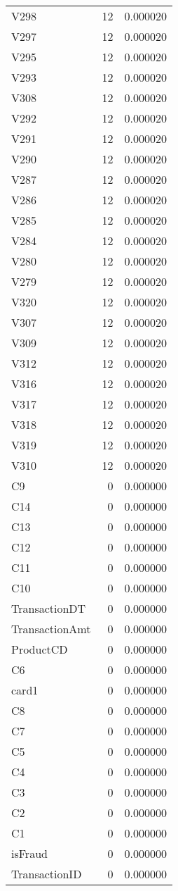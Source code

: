 \begin{tabular}{lrr}
V298 & 12 & 0.000020 \\
V297 & 12 & 0.000020 \\
V295 & 12 & 0.000020 \\
V293 & 12 & 0.000020 \\
V308 & 12 & 0.000020 \\
V292 & 12 & 0.000020 \\
V291 & 12 & 0.000020 \\
V290 & 12 & 0.000020 \\
V287 & 12 & 0.000020 \\
V286 & 12 & 0.000020 \\
V285 & 12 & 0.000020 \\
V284 & 12 & 0.000020 \\
V280 & 12 & 0.000020 \\
V279 & 12 & 0.000020 \\
V320 & 12 & 0.000020 \\
V307 & 12 & 0.000020 \\
V309 & 12 & 0.000020 \\
V312 & 12 & 0.000020 \\
V316 & 12 & 0.000020 \\
V317 & 12 & 0.000020 \\
V318 & 12 & 0.000020 \\
V319 & 12 & 0.000020 \\
V310 & 12 & 0.000020 \\
C9 & 0 & 0.000000 \\
C14 & 0 & 0.000000 \\
C13 & 0 & 0.000000 \\
C12 & 0 & 0.000000 \\
C11 & 0 & 0.000000 \\
C10 & 0 & 0.000000 \\
TransactionDT & 0 & 0.000000 \\
TransactionAmt & 0 & 0.000000 \\
ProductCD & 0 & 0.000000 \\
C6 & 0 & 0.000000 \\
card1 & 0 & 0.000000 \\
C8 & 0 & 0.000000 \\
C7 & 0 & 0.000000 \\
C5 & 0 & 0.000000 \\
C4 & 0 & 0.000000 \\
C3 & 0 & 0.000000 \\
C2 & 0 & 0.000000 \\
C1 & 0 & 0.000000 \\
isFraud & 0 & 0.000000 \\
TransactionID & 0 & 0.000000 \\
\end{tabular}
